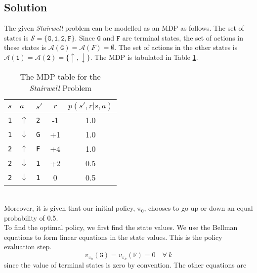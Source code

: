 \documentclass[11pt]{article}
\begin{document}
    \subsection*{Solution}
    The given \textit{Stairwell} problem can be modelled as an MDP as follows. The set of states is
    $\mathcal{S} = \{ \texttt{G}, \texttt{1}, \texttt{2}, \texttt{F} \}$. Since $\texttt{G}$ and
    $\texttt{F}$ are terminal states, the set of actions in these states is
    $\mathcal{A}(\texttt{G}) = \mathcal{A}(F) = \emptyset$. The set of actions in the other states is
    $\mathcal{A}(\texttt{1}) = \mathcal{A}(\texttt{2}) = \{ \uparrow, \downarrow \}$. The MDP is
    tabulated in Table \ref{tab:mdp-stairwell}.
    \begin{table}[ht]
        \centering
        \renewcommand{\arraystretch}{1.25}
        \begin{tabular}{lllc|c}
            $s$ & $a$ & $s'$ & $r$ & $p(s', r | s, a)$ \\
            \hline
            \texttt{1} & $\uparrow$ & \texttt{2} & -1 & 1.0 \\
            \texttt{1} & $\downarrow$ & \texttt{G} & +1 & 1.0 \\
            \texttt{2} & $\uparrow$ & \texttt{F} & +4 & 1.0 \\
            \texttt{2} & $\downarrow$ & \texttt{1} & +2 & 0.5 \\
            \texttt{2} & $\downarrow$ & \texttt{1} & 0 & 0.5 \\
        \end{tabular}
        \caption{The MDP table for the \textit{Stairwell} Problem}
        \label{tab:mdp-stairwell}
    \end{table}
    \vspace*{0pt} \\
    Moreover, it is given that our initial policy, $\pi_{0}$, chooses to go up or down an equal probability of 0.5. \\
    To find the optimal policy, we first find the state values. We use the Bellman equations to form linear
    equations in the state values. This is the policy evaluation step.
    $$v_{\pi_{k}}(\texttt{G}) = v_{\pi_{k}}(\texttt{F}) = 0 \quad \forall \ k$$
    since the value of terminal states is zero by convention. The other equations are
\end{document}

